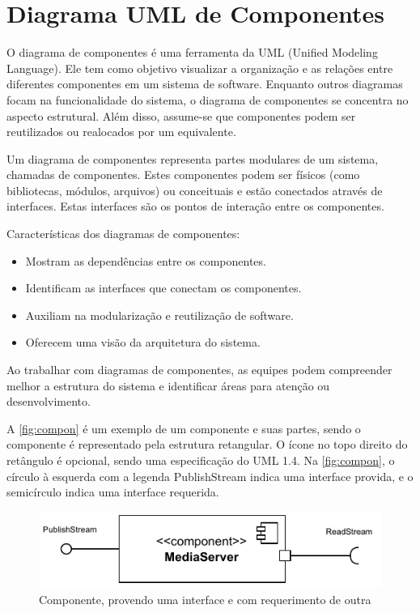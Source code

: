 \documentclass[12pt, %
openright, 
oneside, %
a4paper,    %
brazil]{facom-ufu-abntex2}
\begin{document}
\section{Diagrama UML de Componentes}

O diagrama de componentes é uma ferramenta da UML (Unified Modeling Language).
Ele tem como objetivo visualizar a organização e as relações entre diferentes
componentes em um sistema de software. Enquanto outros diagramas focam na
funcionalidade do sistema, o diagrama de componentes se concentra no aspecto
estrutural. Além disso, assume-se que componentes podem ser reutilizados ou
realocados por um equivalente. \cite{UMLComponentDiagrams2023}

Um diagrama de componentes representa partes modulares de um sistema, chamadas
de componentes. Estes componentes podem ser físicos (como bibliotecas, módulos,
arquivos) ou conceituais e estão conectados através de interfaces. Estas
interfaces são os pontos de interação entre os componentes.

Características dos diagramas de componentes:
\begin{itemize}
	\item Mostram as dependências entre os componentes.
	\item Identificam as interfaces que conectam os componentes.
	\item Auxiliam na modularização e reutilização de software.
	\item Oferecem uma visão da arquitetura do sistema.
\end{itemize}

Ao trabalhar com diagramas de componentes, as equipes podem compreender melhor
a estrutura do sistema e identificar áreas para atenção ou desenvolvimento.

A \autoref{fig:compon} é um exemplo de um componente e suas partes, sendo o
componente é representado pela estrutura retangular. O ícone no topo direito do
retângulo é opcional, sendo uma especificação do UML 1.4. Na
\autoref{fig:compon}, o círculo à esquerda com a legenda PublishStream indica
uma interface provida, e o semicírculo indica uma interface requerida.


\begin{figure}[!ht]
	\centering
	\includegraphics[width=0.8\linewidth]{example_diagram.pdf}
	\caption[Componente de exemplo]{Componente, provendo uma interface e
		com requerimento de outra}
	\label{fig:compon}
\end{figure}
\end{document}
